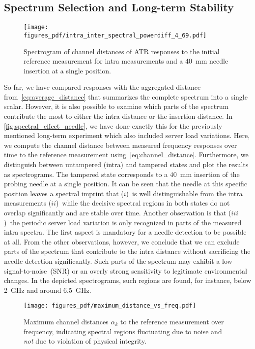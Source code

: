 \documentclass[conference]{IEEEtran}
\begin{document}
\subsection{Spectrum Selection and Long-term Stability}
\begin{figure}
\centering
\texttt{[image: figures\_pdf/intra\_inter\_spectral\_powerdiff\_4\_69.pdf]}
\caption{Spectrogram of channel distances of ATR responses to the initial reference measurement for intra measurements and a \SI{40}{\mm} needle insertion at a single position.}\label{fig:spectral_effect_needle}
\end{figure}
So far, we have compared responses with the aggregated distance from~\autoref{eq:average_distance} that summarizes the complete spectrum into a single scalar. However, it is also possible to examine which parts of the spectrum contribute the most to either the intra distance or the insertion distance. In \autoref{fig:spectral_effect_needle}, we have done exactly this for the previously mentioned long-term experiment which also included server load variations. Here, we compute the channel distance between measured frequency responses over time to the reference measurement using~\autoref{eq:channel_distance}. Furthermore, we distinguish between untampered (intra) and tampered states and plot the results as spectrograms. The tampered state corresponds to a \SI{40}{\mm} insertion of the probing needle at a single position. It can be seen that the needle at this specific position leaves a spectral imprint that ($i$)~is well distinguishable from the intra measurements ($ii$)~while the decisive spectral regions in both states do not overlap significantly and are stable over time. Another observation is that ($iii$)~the periodic server load variation is only recognized in parts of the measured intra spectra. The first aspect is mandatory for a needle detection to be possible at all. From the other observations, however, we conclude that we can exclude parts of the spectrum that contribute to the intra distance without sacrificing the needle detection significantly. Such parts of the spectrum may exhibit a low signal-to-noise~(SNR) or an overly strong sensitivity to legitimate environmental changes. In the depicted spectrograms, such regions are found, for instance, below \SI{2}{\GHz} and around \SI{6.5}{\GHz}.

\begin{figure}
\centering
\texttt{[image: figures\_pdf/maximum\_distance\_vs\_freq.pdf]}
\caption{Maximum channel distances $\alpha_k$ to the reference measurement over frequency, indicating spectral regions fluctuating due to noise and \emph{not} due to violation of physical integrity.}\label{fig:maximum_distance}
\end{figure}
\end{document}
